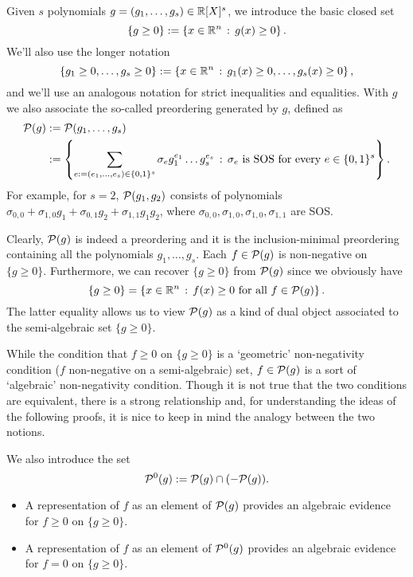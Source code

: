 Given $s$ polynomials $g=(g_1,\ldots,g_s) \in \mathbb{R}[X]^s$, we introduce the basic closed set 
\[
	\{g \ge 0\} := \left\{ x \in \mathbb{R}^n \,:\, g(x) \ge 0 \right\}.
\]
We'll also use the longer notation
\[
	\{g_1 \ge 0,\ldots, g_s \ge 0\} := \left\{  x \in\mathbb{R}^n \,:\, g_1(x) \ge 0,\ldots,g_s(x) \ge 0 \right\},
\]
and we'll use an analogous notation for strict inequalities and equalities. With $g$ we also associate
the so-called preordering generated by $g$, defined as
\begin{align*}
	\cP(g) & := \cP(g_1,\ldots,g_s) 
	\\ & := \setcond{\sum_{e:=(e_1,\ldots,e_s) \in \{0,1\}^s} \sigma_e g_1^{e_1} \ldots g_s^{e_s} }{ \sigma_e \ \text{is SOS} \ \text{for every} \ e \in \{0,1\}^s}.
\end{align*}
For example, for $s=2$, $\mathcal{P}(g_1,g_2)$ consists of polynomials $\sigma_{0,0} + \sigma_{1,0} g_1 + \sigma_{0,1} g_2 + \sigma_{1,1} g_1 g_2$, where $\sigma_{0,0}, \sigma_{1,0}, \sigma_{1,0}, \sigma_{1,1}$ are SOS. 

Clearly, $\mathcal{P}(g)$ is indeed a preordering and it is the inclusion-minimal preordering containing all the polynomials $g_1,\ldots,g_s$. Each $f \in \mathcal{P}(g)$ is non-negative on $\{g \ge 0\}$. Furthermore, we can recover $\{g \ge 0\}$ from $\mathcal{P}(g)$ since we obviously have 
\[
	\{g \ge 0\} = \left\{ x \in \mathbb{R}^n \,:\, f(x) \ge 0 \ \text{for all} \ f \in \mathcal{P}(g) \right\}.
\]
The latter equality allows us to view $\mathcal{P}(g)$ as a kind of dual object associated to the semi-algebraic set $\{g \ge 0\}$. 

While the condition that $f \ge 0$ on $\{g \ge 0\}$ is a `geometric' non-negativity condition ($f$ non-negative on a semi-algebraic) set, $f \in \mathcal{P}(g)$ is a sort of `algebraic' non-negativity condition. Though it is not true that the two conditions are equivalent, there is a strong relationship and, for understanding the ideas of the following proofs, it is nice to keep in mind the analogy between the two notions. 

We also introduce the set 
\[
	\mathcal{P}^0(g):= \mathcal{P}(g) \cap (-\mathcal{P}(g)).
\]

\begin{itemize}
	\item A representation of $f$ as an element of $\mathcal{P}(g)$ provides an algebraic evidence for $f \ge 0$ on $\{g \ge 0\}$. 
	\item A representation of $f$ as an element of $\mathcal{P}^0(g)$ provides an algebraic evidence for $f = 0$ on $\{g \ge 0\}$. 
\end{itemize}

